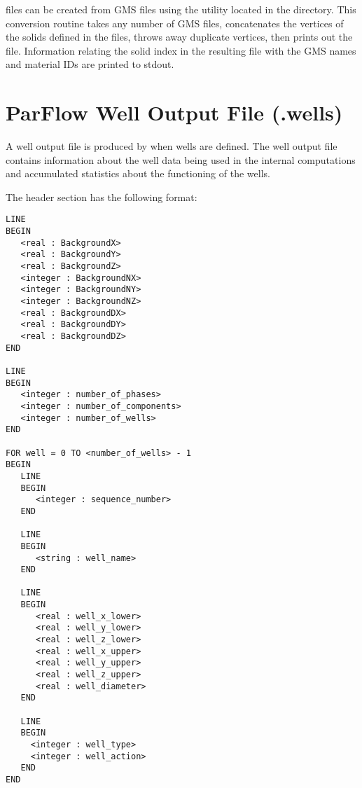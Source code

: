 \parflow{}  files can be created from GMS 
files using the utility  located in the
 directory.
This conversion routine takes any number of GMS  files,
concatenates the vertices of the solids defined in the files, throws
away duplicate vertices, then prints out the  file.
Information relating the solid index in the resulting 
file with the GMS names and material IDs are printed to stdout.


\section{ParFlow Well Output File (.wells)}
\label{ParFlow Well Output File (.wells)}

A well output file is produced by \parflow{} when wells are defined.
The well output file contains information about the well data being
used in the internal computations and accumulated statistics about
the functioning of the wells.

\noindent
The header section has the following format:
\begin{display}\begin{verbatim}
LINE
BEGIN
   <real : BackgroundX>
   <real : BackgroundY>
   <real : BackgroundZ>
   <integer : BackgroundNX>
   <integer : BackgroundNY>
   <integer : BackgroundNZ>
   <real : BackgroundDX>
   <real : BackgroundDY>
   <real : BackgroundDZ>
END

LINE
BEGIN
   <integer : number_of_phases>
   <integer : number_of_components>
   <integer : number_of_wells>
END

FOR well = 0 TO <number_of_wells> - 1
BEGIN
   LINE
   BEGIN
      <integer : sequence_number>
   END

   LINE
   BEGIN
      <string : well_name>
   END

   LINE
   BEGIN
      <real : well_x_lower>
      <real : well_y_lower>
      <real : well_z_lower>
      <real : well_x_upper>
      <real : well_y_upper>
      <real : well_z_upper>
      <real : well_diameter>
   END

   LINE
   BEGIN
     <integer : well_type>
     <integer : well_action>
   END
END
\end{verbatim}\end{display}

